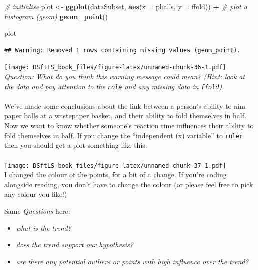 \documentclass[
]{book}
\newenvironment{Shaded}{\begin{snugshade}}{\end{snugshade}}
\newcommand{\CommentTok}[1]{\textcolor[rgb]{0.56,0.35,0.01}{\textit{#1}}}
\newcommand{\DataTypeTok}[1]{\textcolor[rgb]{0.13,0.29,0.53}{#1}}
\newcommand{\KeywordTok}[1]{\textcolor[rgb]{0.13,0.29,0.53}{\textbf{#1}}}
\newcommand{\NormalTok}[1]{#1}
\newcommand{\OperatorTok}[1]{\textcolor[rgb]{0.81,0.36,0.00}{\textbf{#1}}}
\newcommand{\StringTok}[1]{\textcolor[rgb]{0.31,0.60,0.02}{#1}}
\providecommand{\tightlist}{%
  \setlength{\itemsep}{0pt}\setlength{\parskip}{0pt}}
\begin{document}
\begin{Shaded}
\begin{Highlighting}[]
\CommentTok{# initialise}
\NormalTok{plot <-}\StringTok{ }\KeywordTok{ggplot}\NormalTok{(dataSubset, }\KeywordTok{aes}\NormalTok{(}\DataTypeTok{x =}\NormalTok{ pballs, }\DataTypeTok{y =}\NormalTok{ ffold)) }\OperatorTok{+}
\StringTok{    }\CommentTok{# plot a histogram (geom)}
\StringTok{    }\KeywordTok{geom_point}\NormalTok{()}

\NormalTok{plot}
\end{Highlighting}
\end{Shaded}

\begin{verbatim}
## Warning: Removed 1 rows containing missing values (geom_point).
\end{verbatim}

\texttt{[image: DSftLS\_book\_files/figure-latex/unnamed-chunk-36-1.pdf]}\\

\emph{Question: What do you think this warning message could mean? (Hint: look
at the data and pay attention to the \texttt{role} and any missing data in \texttt{ffold}).}\\
~\\

We've made some conclusions about the link between a person's ability to
aim paper balls at a wastepaper basket, and their ability to fold themselves in half.
Now we want to know whether someone's reaction time influences their ability
to fold themselves in half. If you change the ``independent (x) variable'' to
\texttt{ruler} then you should get a plot something like this:\\
~\\
\texttt{[image: DSftLS\_book\_files/figure-latex/unnamed-chunk-37-1.pdf]}\\

I changed the colour of the points, for a bit of a change. If you're coding
alongside reading, you don't have to change the colour
(or please feel free to pick any colour you like!)

Same \emph{Questions} here:

\begin{itemize}
\tightlist
\item
  \emph{what is the trend?}
\item
  \emph{does the trend support our hypothesis?}
\item
  \emph{are there any potential outliers or points with high influence over the trend?}\\
  ~\\
\end{itemize}
\end{document}
